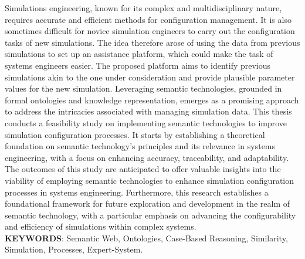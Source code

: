 Simulations engineering, known for its complex and multidisciplinary nature, requires accurate and efficient methods for configuration management. It is also sometimes difficult for novice simulation engineers to carry out the configuration tasks of new simulations. The idea therefore arose of using the data from previous simulations to set up an assistance platform, which could make the task of systems engineers easier. The proposed platform aims to identify previous simulations akin to the one under consideration and provide plausible parameter values for the new simulation. Leveraging semantic technologies, grounded in formal ontologies and knowledge representation, emerges as a promising approach to address the intricacies associated with managing simulation data. This thesis conducts a feasibility study on implementing semantic technologies to improve simulation configuration processes. It starts by establishing a theoretical foundation on semantic technology's principles and its relevance in systems engineering, with a focus on enhancing accuracy, traceability, and adaptability. The outcomes of this study are anticipated to offer valuable insights into the viability of employing semantic technologies to enhance simulation configuration processes in systems engineering. Furthermore, this research establishes a foundational framework for future exploration and development in the realm of semantic technology, with a particular emphasis on advancing the configurability and efficiency of simulations within complex systems.\\

\textbf{KEYWORDS}: Semantic Web, Ontologies, Case-Based Reasoning, Similarity, Simulation, Processes, Expert-System.

